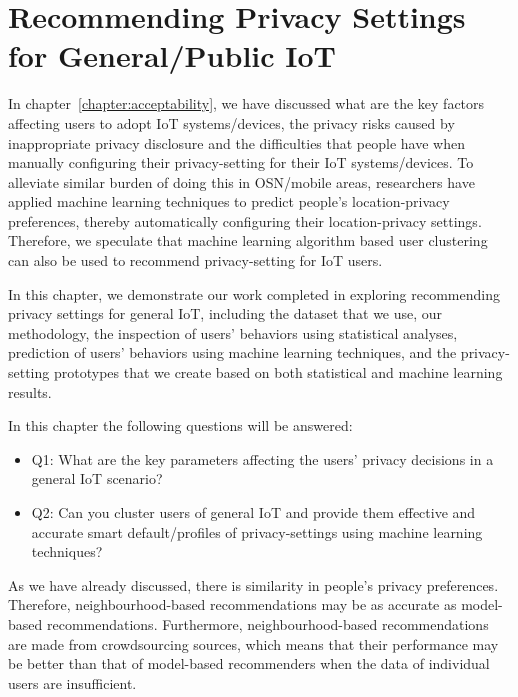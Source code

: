 \chapter{Recommending Privacy Settings for General/Public IoT}\label{chapter:generalIoT}

In chapter~\ref{chapter:acceptability}, we have discussed what are the key factors affecting users to adopt IoT systems/devices, the privacy risks caused by inappropriate privacy disclosure and the difficulties that people have when manually configuring their privacy-setting for their IoT systems/devices. To alleviate similar burden of doing this in OSN/mobile areas, researchers have applied machine learning techniques to predict people’s location-privacy preferences, thereby automatically configuring their location-privacy settings. 
Therefore, we speculate that machine learning algorithm based user clustering can also be used to recommend privacy-setting for IoT users.

In this chapter, we demonstrate our work completed in exploring recommending privacy settings for general IoT, including the dataset that we use, our methodology, the inspection of users' behaviors using statistical analyses, prediction of users' behaviors using machine learning techniques, and the privacy-setting prototypes that we create based on both statistical and machine learning results.

In this chapter the following questions will be answered:
\begin{itemize}
	\item Q1: What are the key parameters affecting the users' privacy decisions in a general IoT scenario?
	\item Q2: Can you cluster users of general IoT and provide them effective and accurate smart default/profiles of privacy-settings using machine learning techniques?
\end{itemize}

As we have already discussed, there is similarity in people’s privacy preferences. Therefore,
neighbourhood-based recommendations may be as accurate as model-based recommendations.
Furthermore, neighbourhood-based recommendations are made from crowdsourcing sources,
which means that their performance may be better than that of model-based recommenders when
the data of individual users are insufficient.

